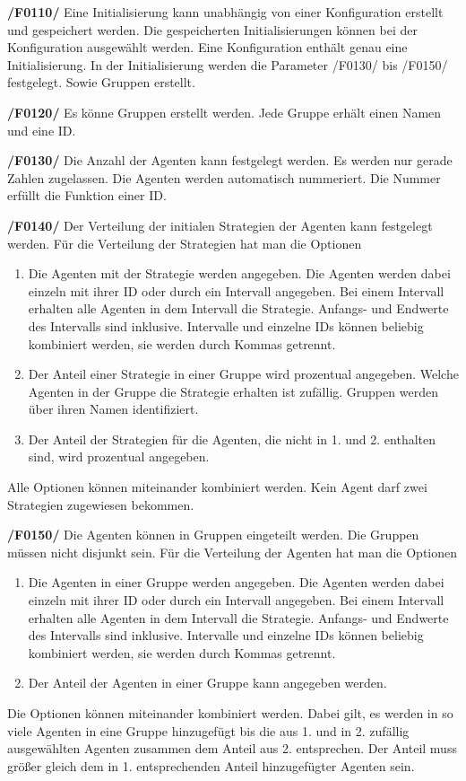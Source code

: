 \textbf{/F0110/}
Eine Initialisierung kann unabhängig von einer Konfiguration erstellt und gespeichert werden. Die gespeicherten Initialisierungen können bei der Konfiguration ausgewählt werden. Eine Konfiguration enthält genau eine Initialisierung. In der Initialisierung werden die Parameter /F0130/ bis /F0150/ festgelegt. Sowie Gruppen erstellt.

\textbf{/F0120/}
Es könne Gruppen erstellt werden. Jede Gruppe erhält einen Namen und eine ID. 

\textbf{/F0130/} 
Die Anzahl der Agenten kann festgelegt werden. Es werden nur gerade Zahlen zugelassen. Die Agenten werden automatisch nummeriert. Die Nummer erfüllt die Funktion einer ID.

\textbf{/F0140/} 
Der Verteilung der initialen Strategien der Agenten kann festgelegt werden. Für die Verteilung der Strategien hat man die Optionen
\begin{enumerate}
\item Die Agenten mit der Strategie werden angegeben. Die Agenten werden dabei einzeln mit ihrer ID oder durch ein Intervall angegeben. Bei einem Intervall erhalten alle Agenten in dem Intervall die Strategie. Anfangs- und Endwerte des Intervalls sind inklusive. Intervalle und einzelne IDs können beliebig kombiniert werden, sie werden durch Kommas getrennt.
\item Der Anteil einer Strategie in einer Gruppe wird prozentual angegeben. Welche Agenten in der Gruppe die Strategie erhalten ist zufällig. Gruppen werden über ihren Namen identifiziert. 
\item Der Anteil der Strategien für die Agenten, die nicht in 1. und 2. enthalten sind, wird prozentual angegeben.
\end{enumerate}
Alle Optionen können miteinander kombiniert werden. Kein Agent darf zwei Strategien zugewiesen bekommen.

\textbf{/F0150/} 
Die Agenten können in Gruppen eingeteilt werden. Die Gruppen müssen nicht disjunkt sein. Für die Verteilung der Agenten hat man die Optionen
\begin{enumerate}
\item Die Agenten in einer Gruppe werden angegeben. Die Agenten werden dabei einzeln mit ihrer ID oder durch ein Intervall angegeben. Bei einem Intervall erhalten alle Agenten in dem Intervall die Strategie. Anfangs- und Endwerte des Intervalls sind inklusive. Intervalle und einzelne IDs können beliebig kombiniert werden, sie werden durch Kommas getrennt.
\item Der Anteil der Agenten in einer Gruppe kann angegeben werden. 
\end{enumerate}
Die Optionen können miteinander kombiniert werden. Dabei gilt, es werden in so viele Agenten in eine Gruppe hinzugefügt bis die aus 1. und in 2. zufällig ausgewählten Agenten zusammen dem Anteil aus 2. entsprechen. Der Anteil muss größer gleich dem in 1. entsprechenden Anteil hinzugefügter Agenten sein. 

